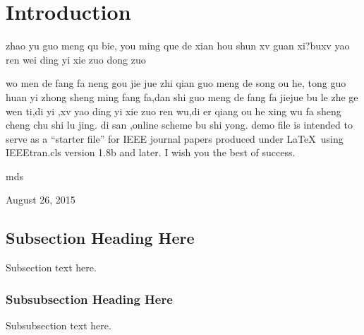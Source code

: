 \documentclass[journal]{IEEEtran}
\begin{document}
%
\IEEEpeerreviewmaketitle



\section{Introduction}
zhao yu guo meng qu bie, you ming que de xian hou shun xv guan xi?buxv yao ren wei ding yi xie zuo dong zuo

wo men de fang fa neng gou jie jue zhi qian guo meng de song ou he, tong guo huan yi zhong sheng ming fang fa,dan shi guo meng de fang fa jiejue bu le zhe ge wen ti,di yi ,xv yao ding yi xie zuo ren wu,di er qiang ou he xing wu fa sheng cheng chu shi lu jing. di san ,online scheme bu shi yong.
%
%
%
%
 demo file is intended to serve as a ``starter file''
for IEEE journal papers produced under \LaTeX\ using
IEEEtran.cls version 1.8b and later.
I wish you the best of success.

\hfill mds

\hfill August 26, 2015

\subsection{Subsection Heading Here}
Subsection text here.


\subsubsection{Subsubsection Heading Here}
Subsubsection text here.
\end{document}
